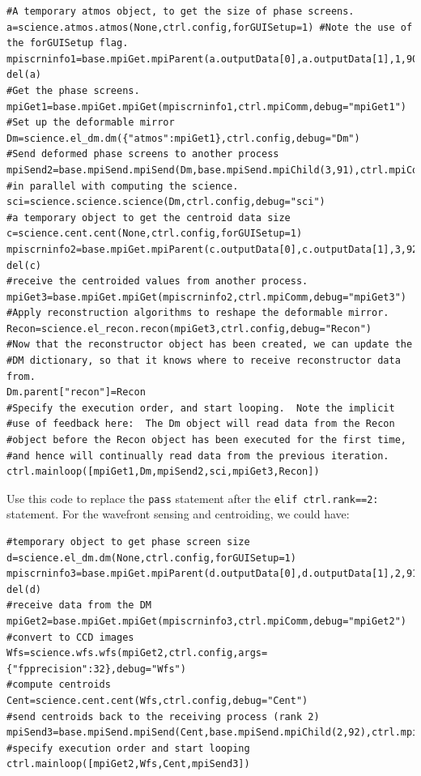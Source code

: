 \documentclass{article}
\begin{document}
\begin{verbatim}
#A temporary atmos object, to get the size of phase screens.  
a=science.atmos.atmos(None,ctrl.config,forGUISetup=1) #Note the use of the forGUISetup flag.
mpiscrninfo1=base.mpiGet.mpiParent(a.outputData[0],a.outputData[1],1,90)
del(a)
#Get the phase screens.
mpiGet1=base.mpiGet.mpiGet(mpiscrninfo1,ctrl.mpiComm,debug="mpiGet1")
#Set up the deformable mirror
Dm=science.el_dm.dm({"atmos":mpiGet1},ctrl.config,debug="Dm")
#Send deformed phase screens to another process
mpiSend2=base.mpiSend.mpiSend(Dm,base.mpiSend.mpiChild(3,91),ctrl.mpiComm,debug="mpiSend2")
#in parallel with computing the science.
sci=science.science.science(Dm,ctrl.config,debug="sci")
#a temporary object to get the centroid data size
c=science.cent.cent(None,ctrl.config,forGUISetup=1)
mpiscrninfo2=base.mpiGet.mpiParent(c.outputData[0],c.outputData[1],3,92)
del(c)
#receive the centroided values from another process.
mpiGet3=base.mpiGet.mpiGet(mpiscrninfo2,ctrl.mpiComm,debug="mpiGet3")
#Apply reconstruction algorithms to reshape the deformable mirror.
Recon=science.el_recon.recon(mpiGet3,ctrl.config,debug="Recon")
#Now that the reconstructor object has been created, we can update the
#DM dictionary, so that it knows where to receive reconstructor data from.
Dm.parent["recon"]=Recon
#Specify the execution order, and start looping.  Note the implicit
#use of feedback here:  The Dm object will read data from the Recon
#object before the Recon object has been executed for the first time,
#and hence will continually read data from the previous iteration.
ctrl.mainloop([mpiGet1,Dm,mpiSend2,sci,mpiGet3,Recon])
\end{verbatim}

Use this code to replace the \texttt{pass} statement after the
\texttt{elif ctrl.rank==2:} statement.  For the wavefront sensing and
centroiding, we could have:

\begin{verbatim}
#temporary object to get phase screen size
d=science.el_dm.dm(None,ctrl.config,forGUISetup=1)
mpiscrninfo3=base.mpiGet.mpiParent(d.outputData[0],d.outputData[1],2,91)
del(d)
#receive data from the DM
mpiGet2=base.mpiGet.mpiGet(mpiscrninfo3,ctrl.mpiComm,debug="mpiGet2")
#convert to CCD images
Wfs=science.wfs.wfs(mpiGet2,ctrl.config,args={"fpprecision":32},debug="Wfs")
#compute centroids
Cent=science.cent.cent(Wfs,ctrl.config,debug="Cent")
#send centroids back to the receiving process (rank 2)
mpiSend3=base.mpiSend.mpiSend(Cent,base.mpiSend.mpiChild(2,92),ctrl.mpiComm,debug="mpiSend3")
#specify execution order and start looping
ctrl.mainloop([mpiGet2,Wfs,Cent,mpiSend3])
\end{verbatim}
\end{document}
